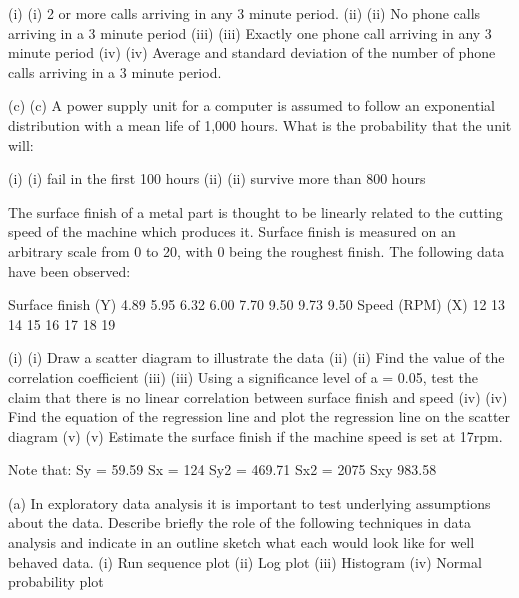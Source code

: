 (i)	(i)                  2 or more calls arriving in any 3 minute period.
(ii)	(ii)                No phone calls arriving in a 3 minute period
(iii)	(iii)               Exactly one phone call arriving in any 3 minute period
(iv)	(iv)              Average and standard deviation of the number of phone calls arriving in a 3 minute period.
 

(c)	(c)    A power supply unit for a computer is assumed to follow an exponential distribution with a mean life of 1,000 hours.  What is the probability that the unit will:
 
(i)	(i)                  fail in the first 100 hours
(ii)	(ii)                survive more than 800 hours
 
 
 

The surface finish of a metal part is thought to be linearly related to the cutting speed of the machine which produces it.  Surface finish is measured on an arbitrary scale from 0 to 20, with 0 being the roughest finish.  The following data have been observed:
 
Surface finish (Y)	4.89	5.95	6.32	6.00	7.70	9.50	9.73	9.50
Speed (RPM) (X)	12	13	14	15	16	17	18	19
 
(i)	(i)                  Draw a scatter diagram to illustrate the data
(ii)	(ii)                Find the value of the correlation coefficient
(iii)	(iii)               Using a significance level of a = 0.05, test the claim that there is no linear correlation between surface finish and speed
(iv)	(iv)              Find the equation of the regression line and plot the regression line on the scatter diagram
(v)	(v)                Estimate the surface finish if the machine speed is set at 17rpm. 
 
 
Note that:
Sy = 	59.59
Sx = 	124
Sy2 = 	469.71
Sx2 = 	2075
Sxy	983.58



(a)	In exploratory data analysis it is important to test underlying assumptions about the data.  Describe briefly the role of the following techniques in data analysis and indicate in an outline sketch what each would look like for well behaved data.
(i)	Run sequence plot
(ii)	Log plot
(iii)	Histogram
(iv)	Normal probability plot


